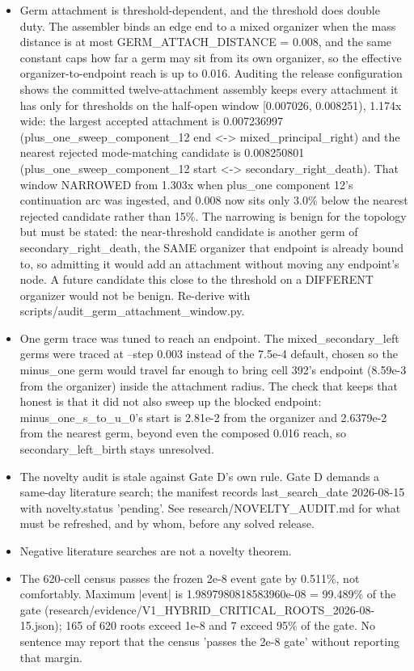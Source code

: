 \begin{itemize}
\item Germ attachment is threshold-dependent, and the threshold does double duty. The assembler binds an edge end to a mixed organizer when the mass distance is at most GERM\_ATTACH\_DISTANCE = 0.008, and the same constant caps how far a germ may sit from its own organizer, so the effective organizer-to-endpoint reach is up to 0.016. Auditing the release configuration shows the committed twelve-attachment assembly keeps every attachment it has only for thresholds on the half-open window [0.007026, 0.008251), 1.174x wide: the largest accepted attachment is 0.007236997 (plus\_one\_sweep\_component\_12 end <-> mixed\_principal\_right) and the nearest rejected mode-matching candidate is 0.008250801 (plus\_one\_sweep\_component\_12 start <-> secondary\_right\_death). That window NARROWED from 1.303x when plus\_one component 12's continuation arc was ingested, and 0.008 now sits only 3.0\% below the nearest rejected candidate rather than 15\%. The narrowing is benign for the topology but must be stated: the near-threshold candidate is another germ of secondary\_right\_death, the SAME organizer that endpoint is already bound to, so admitting it would add an attachment without moving any endpoint's node. A future candidate this close to the threshold on a DIFFERENT organizer would not be benign. Re-derive with scripts/audit\_germ\_attachment\_window.py.
\item One germ trace was tuned to reach an endpoint. The mixed\_secondary\_left germs were traced at --step 0.003 instead of the 7.5e-4 default, chosen so the minus\_one germ would travel far enough to bring cell 392's endpoint (8.59e-3 from the organizer) inside the attachment radius. The check that keeps that honest is that it did not also sweep up the blocked endpoint: minus\_one\_s\_to\_u\_0's start is 2.81e-2 from the organizer and 2.6379e-2 from the nearest germ, beyond even the composed 0.016 reach, so secondary\_left\_birth stays unresolved.
\item The novelty audit is stale against Gate D's own rule. Gate D demands a same-day literature search; the manifest records last\_search\_date 2026-08-15 with novelty.status 'pending'. See research/NOVELTY\_AUDIT.md for what must be refreshed, and by whom, before any solved release.
\item Negative literature searches are not a novelty theorem.
\item The 620-cell census passes the frozen 2e-8 event gate by 0.511\%, not comfortably. Maximum |event| is 1.9897980818583960e-08 = 99.489\% of the gate (research/evidence/V1\_HYBRID\_CRITICAL\_ROOTS\_2026-08-15.json); 165 of 620 roots exceed 1e-8 and 7 exceed 95\% of the gate. No sentence may report that the census 'passes the 2e-8 gate' without reporting that margin.

\end{itemize}
